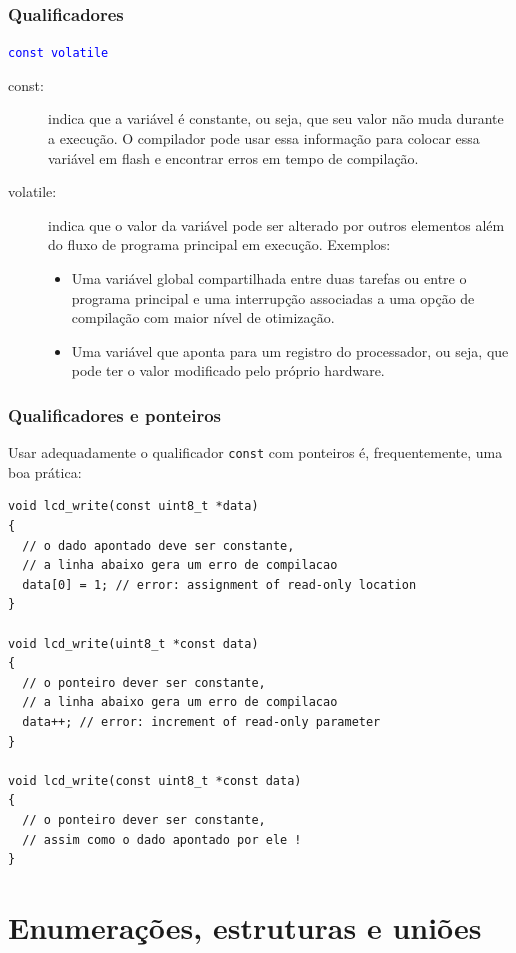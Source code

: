 \documentclass{beamer}
\begin{document}
\begin{frame}
	\frametitle{Qualificadores}
	\begin{center}
		\texttt{\textcolor{blue}{const volatile}}
	\end{center}
		\vspace*{0.5cm}
	\begin{description}
	\item [const:] indica que a variável é constante, ou seja, que seu valor não muda durante a execução. O compilador pode usar essa informação para colocar essa variável em flash e encontrar erros em tempo de compilação.
	\item [volatile:] indica que o valor da variável pode ser alterado por outros elementos além do fluxo de programa principal em execução. Exemplos:
    {\footnotesize
    \begin{itemize}
    \item Uma variável global compartilhada entre duas tarefas ou entre o programa principal e uma interrupção associadas a uma opção de compilação com maior nível de otimização.
    \item Uma variável que aponta para um registro do processador, ou seja, que pode ter o valor modificado pelo próprio hardware.
    \end{itemize}
    }
	\end{description}
\end{frame}

\begin{frame}[fragile]
	\frametitle{Qualificadores e ponteiros}
    Usar adequadamente o qualificador \texttt{const} com ponteiros é, frequentemente, uma boa prática:
		\vspace*{0.5cm}
	\begin{lstlisting}[style=customc]
void lcd_write(const uint8_t *data)
{
  // o dado apontado deve ser constante,
  // a linha abaixo gera um erro de compilacao
  data[0] = 1; // error: assignment of read-only location
}

void lcd_write(uint8_t *const data)
{
  // o ponteiro dever ser constante,
  // a linha abaixo gera um erro de compilacao
  data++; // error: increment of read-only parameter
}

void lcd_write(const uint8_t *const data)
{
  // o ponteiro dever ser constante,
  // assim como o dado apontado por ele !
}
	\end{lstlisting}
\end{frame}

\section{Enumerações, estruturas e uniões}
\end{document}
